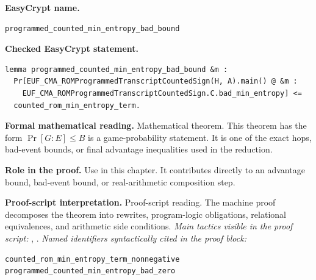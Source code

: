 \begin{formaltheorem}
\noindent\textbf{EasyCrypt name.}
\begin{lstlisting}[language=EasyCrypt,basicstyle=\ttfamily\scriptsize]
programmed_counted_min_entropy_bad_bound
\end{lstlisting}
\noindent\textbf{Checked EasyCrypt statement.}
\begin{lstlisting}[language=EasyCrypt,basicstyle=\ttfamily\scriptsize]
lemma programmed_counted_min_entropy_bad_bound &m :
  Pr[EUF_CMA_ROMProgrammedTranscriptCountedSign(H, A).main() @ &m :
    EUF_CMA_ROMProgrammedTranscriptCountedSign.C.bad_min_entropy] <=
  counted_rom_min_entropy_term.
\end{lstlisting}
\noindent\textbf{Formal mathematical reading.}
Mathematical theorem. This theorem has the form \(\Pr[G:E] \le B\) is a game-probability statement.  It is one of the exact hops, bad-event bounds, or final advantage inequalities used in the reduction.

\noindent\textbf{Role in the proof.}
Use in this chapter. It contributes directly to an advantage bound, bad-event bound, or real-arithmetic composition step.

\noindent\textbf{Proof-script interpretation.}
Proof-script reading. The machine proof decomposes the theorem into rewrites, program-logic obligations, relational equivalences, and arithmetic side conditions.
\emph{Main tactics visible in the proof script:} , .
\emph{Named identifiers syntactically cited in the proof block:}
\begin{lstlisting}[language=EasyCrypt,basicstyle=\ttfamily\scriptsize]
counted_rom_min_entropy_term_nonnegative
programmed_counted_min_entropy_bad_zero
\end{lstlisting}

\end{formaltheorem}

